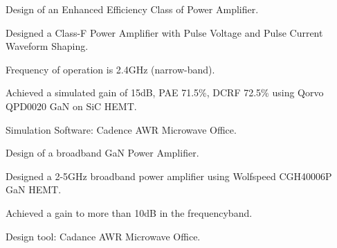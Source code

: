 

\begin{cventries}
  \cventry
    {Design of an Enhanced Efficiency Class of Power Amplifier.} %
    {} %
    {} %
    {} %
    {
      \begin{cvitems} %
        \item {Designed a Class-F Power Amplifier with Pulse Voltage and Pulse Current Waveform Shaping.}
        \item {Frequency of operation is 2.4GHz (narrow-band).}
        \item {Achieved a simulated gain of 15dB, PAE 71.5\%, DCRF 72.5\% using Qorvo QPD0020 GaN on SiC HEMT.}
        \item {Simulation Software: Cadence AWR Microwave Office.}
      \end{cvitems}
    }


  \cventry
    {Design of a broadband GaN Power Amplifier.} %
    {} %
    {} %
    {} %
    {
      \begin{cvitems} %
        \item {Designed a 2-5GHz broadband power amplifier using Wolfspeed CGH40006P GaN HEMT.}
        \item {Achieved a gain to more than 10dB in the frequencyband.}
        \item {Design tool: Cadance AWR Microwave Office.}
      \end{cvitems}
    }



\end{cventries}
